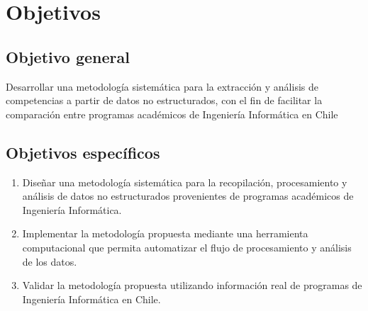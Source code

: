 \chapter{Objetivos}
\label{cap:objetivos}

\section{Objetivo general}
Desarrollar una metodología sistemática para la extracción y análisis de competencias a partir de datos no estructurados, con el fin de facilitar la comparación entre programas académicos de Ingeniería Informática en Chile


\section{Objetivos específicos}
\begin{enumerate}
    \item Diseñar una metodología sistemática para la recopilación, procesamiento y análisis de datos no estructurados provenientes de programas académicos de Ingeniería Informática.
    \item Implementar la metodología propuesta mediante una herramienta computacional que permita automatizar el flujo de procesamiento y análisis de los datos.
    \item Validar la metodología propuesta utilizando información real de programas de Ingeniería Informática en Chile.
\end{enumerate}
